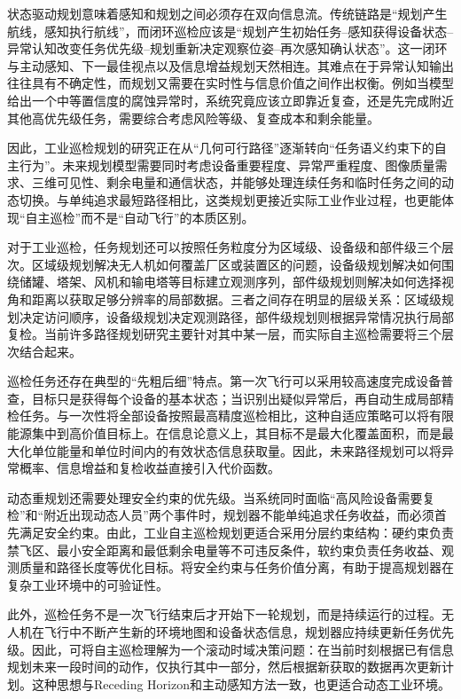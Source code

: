 状态驱动规划意味着感知和规划之间必须存在双向信息流。传统链路是“规划产生航线，感知执行航线”，而闭环巡检应该是“规划产生初始任务--感知获得设备状态--异常认知改变任务优先级--规划重新决定观察位姿--再次感知确认状态”。这一闭环与主动感知、下一最佳视点以及信息增益规划天然相连。其难点在于异常认知输出往往具有不确定性，而规划又需要在实时性与信息价值之间作出权衡。例如当模型给出一个中等置信度的腐蚀异常时，系统究竟应该立即靠近复查，还是先完成附近其他高优先级任务，需要综合考虑风险等级、复查成本和剩余能量。

因此，工业巡检规划的研究正在从“几何可行路径”逐渐转向“任务语义约束下的自主行为”。未来规划模型需要同时考虑设备重要程度、异常严重程度、图像质量需求、三维可见性、剩余电量和通信状态，并能够处理连续任务和临时任务之间的动态切换。与单纯追求最短路径相比，这类规划更接近实际工业作业过程，也更能体现“自主巡检”而不是“自动飞行”的本质区别。



对于工业巡检，任务规划还可以按照任务粒度分为区域级、设备级和部件级三个层次。区域级规划解决无人机如何覆盖厂区或装置区的问题，设备级规划解决如何围绕储罐、塔架、风机和输电塔等目标建立观测序列，部件级规划则解决如何选择视角和距离以获取足够分辨率的局部数据。三者之间存在明显的层级关系：区域级规划决定访问顺序，设备级规划决定观测路径，部件级规划则根据异常情况执行局部复检。当前许多路径规划研究主要针对其中某一层，而实际自主巡检需要将三个层次结合起来。

巡检任务还存在典型的“先粗后细”特点。第一次飞行可以采用较高速度完成设备普查，目标只是获得每个设备的基本状态；当识别出疑似异常后，再自动生成局部精检任务。与一次性将全部设备按照最高精度巡检相比，这种自适应策略可以将有限能源集中到高价值目标上。在信息论意义上，其目标不是最大化覆盖面积，而是最大化单位能量和单位时间内的有效状态信息获取量。因此，未来路径规划可以将异常概率、信息增益和复检收益直接引入代价函数。

动态重规划还需要处理安全约束的优先级。当系统同时面临“高风险设备需要复检”和“附近出现动态人员”两个事件时，规划器不能单纯追求任务收益，而必须首先满足安全约束。由此，工业自主巡检规划更适合采用分层约束结构：硬约束负责禁飞区、最小安全距离和最低剩余电量等不可违反条件，软约束负责任务收益、观测质量和路径长度等优化目标。将安全约束与任务价值分离，有助于提高规划器在复杂工业环境中的可验证性。

此外，巡检任务不是一次飞行结束后才开始下一轮规划，而是持续运行的过程。无人机在飞行中不断产生新的环境地图和设备状态信息，规划器应持续更新任务优先级。因此，可将自主巡检理解为一个滚动时域决策问题：在当前时刻根据已有信息规划未来一段时间的动作，仅执行其中一部分，然后根据新获取的数据再次更新计划。这种思想与Receding Horizon和主动感知方法一致，也更适合动态工业环境。

